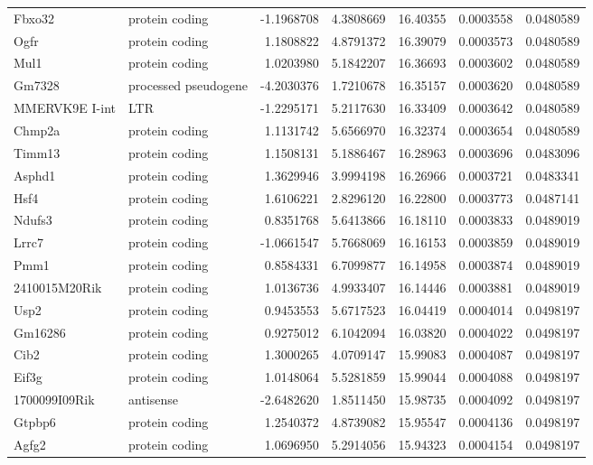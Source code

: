\documentclass[onehalf,12pt]{beavtex}
\begin{document}
\begin{longtable}{llrrrrr}
  Fbxo32 & protein coding & -1.1968708 & 4.3808669 & 16.40355 & 0.0003558 & 0.0480589\\
  \addlinespace
  Ogfr & protein coding & 1.1808822 & 4.8791372 & 16.39079 & 0.0003573 & 0.0480589\\
  Mul1 & protein coding & 1.0203980 & 5.1842207 & 16.36693 & 0.0003602 & 0.0480589\\
  Gm7328 & processed pseudogene & -4.2030376 & 1.7210678 & 16.35157 & 0.0003620 & 0.0480589\\
  MMERVK9E I-int & LTR & -1.2295171 & 5.2117630 & 16.33409 & 0.0003642 & 0.0480589\\
  Chmp2a & protein coding & 1.1131742 & 5.6566970 & 16.32374 & 0.0003654 & 0.0480589\\
  \addlinespace
  Timm13 & protein coding & 1.1508131 & 5.1886467 & 16.28963 & 0.0003696 & 0.0483096\\
  Asphd1 & protein coding & 1.3629946 & 3.9994198 & 16.26966 & 0.0003721 & 0.0483341\\
  Hsf4 & protein coding & 1.6106221 & 2.8296120 & 16.22800 & 0.0003773 & 0.0487141\\
  Ndufs3 & protein coding & 0.8351768 & 5.6413866 & 16.18110 & 0.0003833 & 0.0489019\\
  Lrrc7 & protein coding & -1.0661547 & 5.7668069 & 16.16153 & 0.0003859 & 0.0489019\\
  \addlinespace
  Pmm1 & protein coding & 0.8584331 & 6.7099877 & 16.14958 & 0.0003874 & 0.0489019\\
  2410015M20Rik & protein coding & 1.0136736 & 4.9933407 & 16.14446 & 0.0003881 & 0.0489019\\
  Usp2 & protein coding & 0.9453553 & 5.6717523 & 16.04419 & 0.0004014 & 0.0498197\\
  Gm16286 & protein coding & 0.9275012 & 6.1042094 & 16.03820 & 0.0004022 & 0.0498197\\
  Cib2 & protein coding & 1.3000265 & 4.0709147 & 15.99083 & 0.0004087 & 0.0498197\\
  \addlinespace
  Eif3g & protein coding & 1.0148064 & 5.5281859 & 15.99044 & 0.0004088 & 0.0498197\\
  1700099I09Rik & antisense & -2.6482620 & 1.8511450 & 15.98735 & 0.0004092 & 0.0498197\\
  Gtpbp6 & protein coding & 1.2540372 & 4.8739082 & 15.95547 & 0.0004136 & 0.0498197\\
  Agfg2 & protein coding & 1.0696950 & 5.2914056 & 15.94323 & 0.0004154 & 0.0498197\\

\end{longtable}
\end{document}

